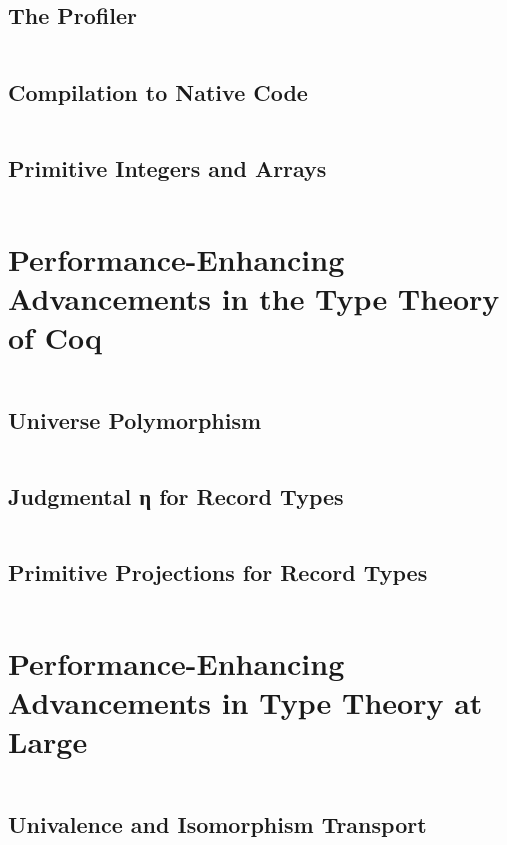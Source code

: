 \subsection{The \Ltac\space Profiler}\label{sec:ltac-prof}
$\left.\right.$
\subsection{Compilation to Native Code}\label{sec:native-compiler}
$\left.\right.$
\subsection{Primitive Integers and Arrays}\label{sec:prim-ints-arrays}
$\left.\right.$


\section{Performance-Enhancing Advancements in the Type Theory of Coq}\label{sec:fixes:coq-theory}
$\left.\right.$
\subsection{Universe Polymorphism}\label{sec:fixes:theory:univ-poly}\label{sec:univ-poly}
$\left.\right.$
\subsection{Judgmental η for Record Types}\label{sec:fixes:theory:record-eta}\label{sec:record-eta}
$\left.\right.$
\subsection{Primitive Projections for Record Types}\label{sec:fixes:theory:primitive-projections}\label{sec:primitive-projections}
$\left.\right.$

\section{Performance-Enhancing Advancements in Type Theory at Large}\label{sec:fixes:theory}
$\left.\right.$
\subsection{Univalence and Isomorphism Transport}\label{sec:fixes:theory:univalence}\label{sec:univalence}
$\left.\right.$
